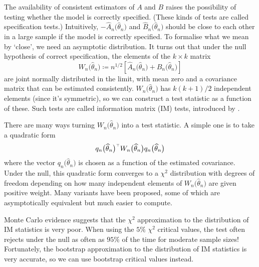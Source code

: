 \documentclass[11pt,letterpaper,reqno,oneside]{article}
\begin{document}
The availability of consistent estimators of $A$ and $B$ raises the possibility of testing whether the model is correctly specified. (These kinds of tests are called specification tests.) Intuitively, $-\widehat{A}_n\bigl( \widehat{\theta}_n \bigr)$ and $\widehat{B}_n\bigl( \widehat{\theta}_n \bigr)$ should be close to each other in a large sample if the model is correctly specified. To formalise what we mean by `close', we need an asymptotic distribution. It turns out that under the null hypothesis of correct specification, the elements of the $k \times k$ matrix
%
\begin{equation*}
	W_n\bigl( \widehat{\theta}_n \bigr) 
	\coloneqq n^{1/2} \left[ \widehat{A}_n\bigl( \widehat{\theta}_n \bigr) 
	+ \widehat{B}_n\bigl( \widehat{\theta}_n \bigr) \right]
\end{equation*}
%
are joint normally distributed in the limit, with mean zero and a covariance matrix that can be estimated consistently. $W_n\bigl( \widehat{\theta}_n \bigr)$ has $k(k+1)/2$ independent elements (since it's symmetric), so we can construct a test statistic as a function of these. Such tests are called information matrix (IM) tests, introduced by \textcite{White1982}.

There are many ways turning $W_n\bigl( \widehat{\theta}_n \bigr)$ into a test statistic. A simple one is to take a quadratic form
%
\begin{equation*}
	q_n\bigl( \widehat{\theta}_n \bigr)^{\scriptscriptstyle \top} 
	W_n\bigl( \widehat{\theta}_n \bigr) 
	q_n\bigl( \widehat{\theta}_n \bigr)
\end{equation*}
%
where the vector $q_n\bigl( \widehat{\theta}_n \bigr)$ is chosen as a function of the estimated covariance. Under the null, this quadratic form converges to a $\chi^2$ distribution with degrees of freedom depending on how many independent elements of $W_n\bigl( \widehat{\theta}_n \bigr)$ are given positive weight. Many variants have been proposed, some of which are asymptotically equivalent but much easier to compute.

Monte Carlo evidence suggests that the $\chi^2$ approximation to the distribution of IM statistics is very poor. When using the $5\%$ $\chi^2$ critical values, the test often rejects under the null as often as $95\%$ of the time for moderate sample sizes! Fortunately, the bootstrap approximation to the distribution of IM statistics is very accurate, so we can use bootstrap critical values instead.



\end{document}
